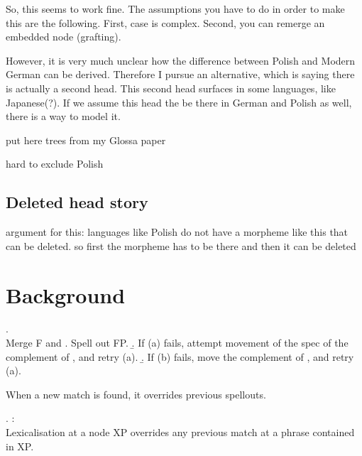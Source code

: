 So, this seems to work fine. The assumptions you have to do in order to make this are the following. First, case is complex. Second, you can remerge an embedded node (grafting).










However, it is very much unclear how the difference between Polish and Modern German can be derived. Therefore I pursue an alternative, which is saying there is actually a second head. This second head surfaces in some languages, like Japanese(?). If we assume this head the be there in German and Polish as well, there is a way to model it.







put here trees from my Glossa paper



hard to exclude Polish



\subsection{Deleted head story}

argument for this: languages like Polish do not have a morpheme like this that can be deleted.
so first the morpheme has to be there and then it can be deleted














\section{Background}

\ex. \\
Merge F and \label{ex:spellout}
 \a. Spell out FP.
 \b. If (a) fails, attempt movement of the spec of the complement of , and retry (a).
 \b. If (b) fails, move the complement of , and retry (a).

When a new match is found, it overrides previous spellouts.

\ex.  \citep{starke2018}:\\
Lexicalisation at a node XP overrides any previous match at a phrase contained in XP.

